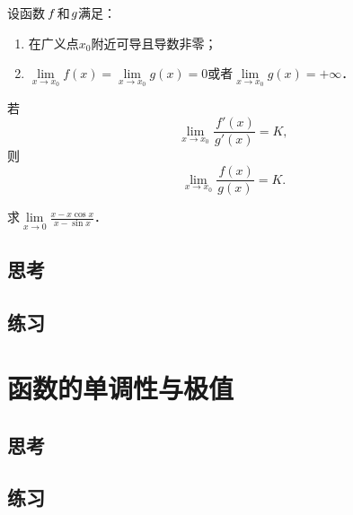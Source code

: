 \begin{theorem*}
  \label{thm:lhospital}
  设函数\(\,f\mkern2mu\)和\(\mkern1mu g\)满足：
  \begin{enumerate}
    \renewcommand{\labelenumi}{\enumparen{\arabic{enumi}}}
  \item 在广义点\(x_0\)附近可导且导数非零；
  \item \(\!\lim\limits_{x\to x_0\!} f(x) = \!\lim\limits_{x\to x_0\!} g(x) = 0\)或者\(\!\lim\limits_{x\to x_0\!} g(x) = +\infty\)．
  \end{enumerate}
  若
  \begin{equation*}
    \lim_{x\to x_0} \frac{\,f'(x)}{g'(x)} = K,
  \end{equation*}
  则
  \begin{equation*}
    \lim_{x\to x_0} \frac{\,f(x)}{g(x)}
    = K.
  \end{equation*}
\end{theorem*}

\begin{example*}
  求\(\lim\limits_{x\to0} \frac{x-x\cos x}{x - \sin x}\)．
\end{example*}

\subsection*{思考}

\ifshowex
{}
\subsection*{练习}
\fi

\section{函数的单调性与极值}

\subsection*{思考}

\ifshowex
{}
\subsection*{练习}
\fi

